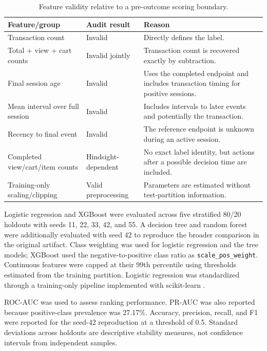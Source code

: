 \documentclass[conference, letterpaper]{IEEEtran}
\begin{document}
\begin{table}[t]
\caption{Feature validity relative to a pre-outcome scoring boundary.}
\label{tab:audit}
\centering
\scriptsize
\begin{tabularx}{\columnwidth}{@{}L{0.27\columnwidth}L{0.22\columnwidth}Y@{}}
\toprule
Feature/group & Audit result & Reason \\
\midrule
Transaction count & Invalid & Directly defines the label. \\
Total + view + cart counts & Invalid jointly & Transaction count is recovered exactly by subtraction. \\
Final session age & Invalid & Uses the completed endpoint and includes transaction timing for positive sessions. \\
Mean interval over full session & Invalid & Includes intervals to later events and potentially the transaction. \\
Recency to final event & Invalid & The reference endpoint is unknown during an active session. \\
Completed view/cart/item counts & Hindsight-dependent & No exact label identity, but actions after a possible decision time are included. \\
Training-only scaling/clipping & Valid preprocessing & Parameters are estimated without test-partition information. \\
\bottomrule
\end{tabularx}
\end{table}

Logistic regression and XGBoost \cite{chen2016} were evaluated across five stratified 80/20 holdouts with seeds 11, 22, 33, 42, and 55. A decision tree and random forest \cite{breiman2001} were additionally evaluated with seed 42 to reproduce the broader comparison in the original artifact. Class weighting was used for logistic regression and the tree models; XGBoost used the negative-to-positive class ratio as \texttt{scale\_pos\_weight}. Continuous features were capped at their 99th percentile using thresholds estimated from the training partition. Logistic regression was standardized through a training-only pipeline implemented with scikit-learn \cite{pedregosa2011}.

ROC-AUC was used to assess ranking performance. PR-AUC was also reported because positive-class prevalence was 27.17\%. Accuracy, precision, recall, and F1 were reported for the seed-42 reproduction at a threshold of 0.5. Standard deviations across holdouts are descriptive stability measures, not confidence intervals from independent samples.
\end{document}
